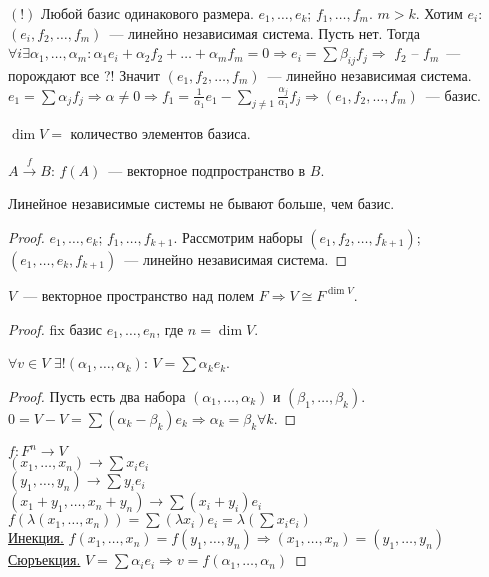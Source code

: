 \documentclass{article}
\begin{document}
	$(!)$ Любой базис одинакового размера. $e_1, \dots, e_k$; $f_1, \dots, f_m$. $m > k$. Хотим $e_i$: $(e_i, f_2, \dots, f_m)$~--- линейно независимая система. Пусть нет. Тогда $\forall i \exists \alpha_1, \dots, \alpha_m: \alpha_1e_i + \alpha_2f_2 + \dots + \alpha_mf_m = 0 \Rightarrow e_i = \sum \beta_{ij} f_j \Rightarrow$ $f_2$ -- $f_m$~--- порождают все ?! Значит $(e_1, f_2, \dots, f_m)$~--- линейно независимая система. $e_1 = \sum \alpha_j f_j \Rightarrow \alpha \not= 0 \Rightarrow f_1 = \frac{1}{\alpha_1}e_1 - \sum\limits_{j \not= 1} \frac{\alpha_j}{\alpha_1} f_j \Rightarrow (e_1, f_2, \dots, f_m)$~--- базис.
	\begin{definition}
		$\dim V = $ количество элементов базиса.
	\end{definition}
	\noindent
	$A \xrightarrow{f} B$: $f(A)$~--- векторное подпространство в $B$.
	\begin{statement}
		Линейное независимые системы не бывают больше, чем базис.
	\end{statement}
	\begin{proof}
		$e_1, \dots, e_k$; $f_1, \dots, f_{k + 1}$. Рассмотрим наборы $(e_1, f_2, \dots, f_{k + 1})$; $(e_1, \dots, e_k, f_{k + 1})$~--- линейно независимая система.
	\end{proof}
	\begin{theorem}
		$V$~--- векторное пространство над полем $F \Rightarrow V \cong F^{\dim V}$.
	\end{theorem}
	\begin{proof}
		fix базис $e_1, \dots, e_n$, где $n = \dim V$.
		\begin{lemma}
			$\forall v \in V$ $\exists! (\alpha_1, \dots, \alpha_k)$: $V = \sum \alpha_k e_k$.
		\end{lemma}
		\begin{proof}
			Пусть есть два набора $(\alpha_1, \dots, \alpha_k)$ и $(\beta_1, \dots, \beta_k)$. $0 = V - V = \sum (\alpha_k - \beta_k)e_k \Rightarrow \alpha_k = \beta_k \forall k$.
		\end{proof}
		\noindent
		$f: F^n \rightarrow V$ \\
		$(x_1, \dots, x_n) \rightarrow \sum x_i e_i$ \\
		$(y_1, \dots, y_n) \rightarrow \sum y_i e_i$ \\
		$(x_1 + y_1, \dots, x_n + y_n) \rightarrow \sum (x_i + y_i) e_i$ \\
		$f(\lambda (x_1, \dots, x_n)) = \sum (\lambda x_i) e_i = \lambda (\sum x_i e_i)$ \\
		\underline{Инекция.} $f(x_1, \dots, x_n) = f(y_1, \dots, y_n) \Rightarrow (x_1, \dots, x_n) = (y_1, \dots, y_n)$ \\
		\underline{Сюръекция.} $V = \sum \alpha_i e_i \Rightarrow v = f(\alpha_1, \dots, \alpha_n)$
	\end{proof}
\end{document}
